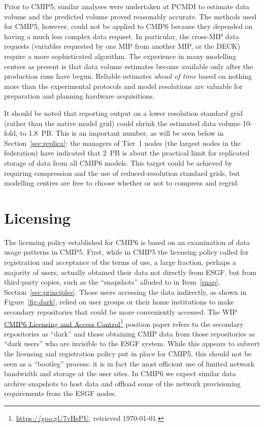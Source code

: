 \documentclass[gmd,manuscript]{copernicus}
\newcommand{\urlref}[2] {\href{#1}{#2}\footnote{\url{#1}, retrieved \today.}}
\begin{document}
Prior to CMIP5, similar analyses were undertaken at PCMDI to estimate data
volume and the predicted volume proved reasonably accurate. 
The methods used for CMIP5, however, could not be applied to CMIP6 because 
they depended on having a much less complex data request.  
In particular, the cross-MIP data requests (variables requested by one
MIP from another MIP, or the DECK) require a more sophisticated
algorithm. The experience in many
modelling centres as present is that data volume estimates become
available only after the production runs have begun. Reliable estimates
\emph{ahead of time} based on nothing more than the experimental
protocols and model resolutions are valuable for preparation and planning
hardware acquisitions.

It should be noted that reporting output on a lower resolution
standard grid (rather than the native model grid) could shrink the estimated
data volume 10-fold, to 1.8~PB. This is an important number, as will be
seen below in Section~\ref{sec:replica}: the managers of Tier~1 nodes
(the largest nodes in the federation) have indicated that 2~PB is
about the practical limit for replicated storage of data from
all CMIP6 models.
This target could be achieved by requiring compression and the use of 
reduced-resolution standard grids, but modelling centres are free to choose
whether or not to compress and regrid.

\section{Licensing}
\label{sec:licensing}

The licensing policy established for CMIP6 is based on an examination of
data usage patterns in CMIP5. First, while in CMIP5 the licensing policy called
for registration and acceptance of the terms of use, a large fraction,
perhaps a majority of users, actually obtained their data not directly
from ESGF, but from
third-party copies, such as the ``snapshots'' alluded to in
Item~\ref{snap}, Section~\ref{sec:principles}. Those users accessing
the data indirectly, as shown in Figure~\ref{fig:dark}, relied on user
groups or their home institutions to make secondary repositories that
could be more conveniently accessed. The WIP
\urlref{https://goo.gl/7vHsPU}{CMIP6 Licensing and Access Control}
position paper refers to the secondary repositories as ``dark'' and
those obtaining CMIP data from those repositories as ``dark users''
who are invisible to the ESGF system. While this appears to subvert
the licensing and registration policy put in place for CMIP5, this
should not be seen as a ``bootleg'' process: it is in fact the most
efficient use of limited network bandwidth and storage at the user sites.
In CMIP6 we expect similar data archive snapshots to host data and offload some of the
network provisioning requirements from the ESGF nodes.
\end{document}
